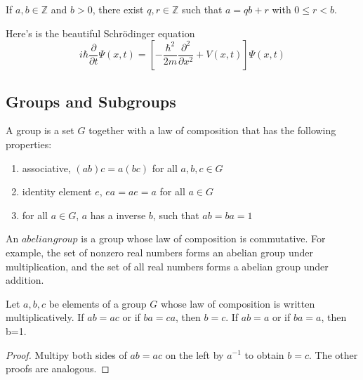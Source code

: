 \documentclass{tufte-handout}
\newcommand{\Z}{\mathbb{Z}}
\begin{document}
\begin{lemma}
	If $a,b \in \Z$ and $b>0$, there exist $q,r\in \Z$ such that $a=qb+r$ with $0\le r < b$.
\end{lemma}


\begin{definition}
\lipsum[1][0-10]
\end{definition}

\begin{definition}%
	\normalfont
	Here's is the beautiful Schr\"odinger equation
	\[ i\hbar {\frac {\partial }{\partial t}}\Psi (x,t)=
	\left[-{\frac {\hbar ^{2}}{2m}}{\frac {\partial ^{2}}{\partial x^{2}}}+V(x,t)\right]\Psi (x,t)\]
\end{definition}

\subsection{Groups and Subgroups}

A group is a set $G$ together with a law of composition that has the following properties:

\begin{enumerate}
	\item associative, $(ab)c=a(bc)$ for all $a,b,c\in G$
	\item identity element $e$, $ea=ae=a$ for all $a\in G$
	\item for all $a\in G$, $a$ has a inverse $b$, such that $ab=ba=1$
\end{enumerate}

An $abelian group$ is a group whose law of composition is commutative. For example, the set of nonzero real numbers forms an abelian group under multiplication, and the set of all real numbers forms a abelian group under addition.

\begin{proposition}
	Let $a,b,c$ be elements of a group $G$ whose law of composition is written multiplicatively. If $ab=ac$ or if $ba=ca$, then $b=c$. If $ab=a$ or if $ba=a$, then b=1.
\end{proposition}
\begin{proof}
	Multipy both sides of $ab=ac$ on the left by $a^{-1}$ to obtain $b=c$. The other proofs are analogous. 
\end{proof}
\end{document}
